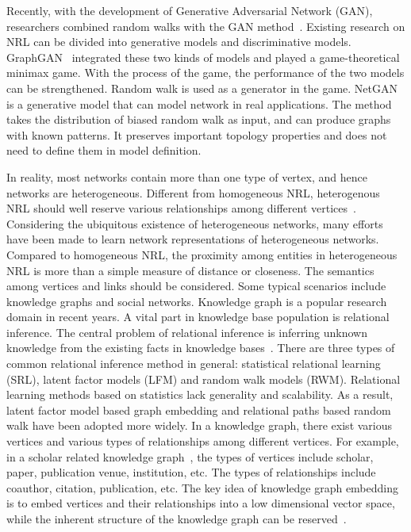 Recently, with the development of Generative Adversarial Network (GAN), researchers combined random walks with the GAN method~. Existing research on NRL can be divided into generative models and discriminative models. GraphGAN~ integrated these two kinds of models and played a game-theoretical minimax game. With the process of the game, the performance of the two models can be strengthened. Random walk is used as a generator in the game. NetGAN~ is a generative model that can model network in real applications. The method takes the distribution of biased random walk as input, and can produce graphs with known patterns. It preserves important topology properties and does not need to define them in model definition.

In reality, most networks contain more than one type of vertex, and hence networks are heterogeneous. Different from homogeneous NRL, heterogenous NRL should well reserve various relationships among different vertices~. Considering the ubiquitous existence of heterogeneous networks, many efforts have been made to learn network representations of heterogeneous networks. Compared to homogeneous NRL, the proximity among entities in heterogeneous NRL is more than a simple measure of distance or closeness. The semantics among vertices and links should be considered. Some typical scenarios include knowledge graphs and social networks.
Knowledge graph is a popular research domain in recent years. A vital part in knowledge base population is relational inference. The central problem of relational inference is inferring unknown knowledge from the existing facts in knowledge bases~. There are three types of common relational inference method in general: statistical relational learning (SRL), latent factor models (LFM) and random walk models (RWM). Relational learning methods based on statistics lack generality and scalability. As a result, latent factor model based graph embedding and relational paths based random walk have been adopted more widely.
In a knowledge graph, there exist various vertices and various types of relationships among different vertices. For example, in a scholar related knowledge graph~, the types of vertices include scholar, paper, publication venue, institution, etc. The types of relationships include coauthor, citation, publication, etc. The key idea of knowledge graph embedding is to embed vertices and their relationships into a low dimensional vector space, while the inherent structure of the knowledge graph can be reserved~.
